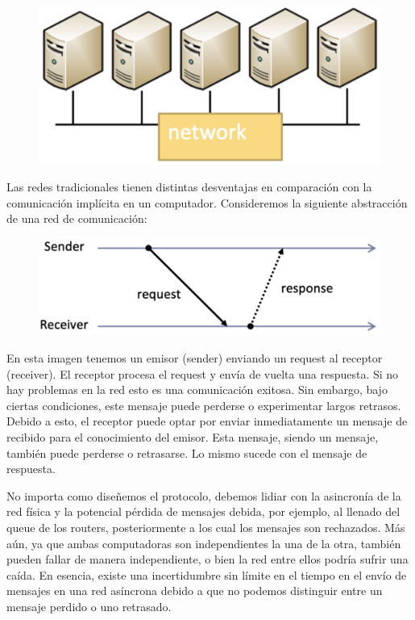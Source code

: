 \documentclass[12pt]{article}
\begin{document}
\begin{figure}[h]
   \centering
   \includegraphics[scale=0.5]{red_computadoras.png}
\end{figure}


Las redes tradicionales tienen distintas desventajas en comparación con la comunicación implícita en un computador. 
Consideremos la siguiente abstracción de una red de comunicación:

\begin{figure}[h]
   \centering
   \includegraphics[scale=0.5]{red_comunicacion.png}
\end{figure}

En esta imagen tenemos un emisor (sender) enviando un request al receptor (receiver).
El receptor procesa el request y envía de vuelta una respuesta. 
Si no hay problemas en la red esto es una comunicación exitosa.
Sin embargo, bajo ciertas condiciones, 
este mensaje puede perderse o experimentar largos retrasos.
Debido a esto,
el receptor puede optar por enviar inmediatamente un mensaje de recibido para el conocimiento del emisor.
Esta mensaje, siendo un mensaje, también puede perderse o retrasarse.
Lo mismo sucede con el mensaje de respuesta.

No importa como diseñemos el protocolo, debemos lidiar con la asincronía de la red física y la potencial pérdida de mensajes debida,
por ejemplo,
al llenado del queue de los routers,
posteriormente a los cual los mensajes son rechazados.
Más aún, 
ya que ambas computadoras son independientes la una de la otra,
también pueden fallar de manera independiente, 
o bien la red entre ellos podría sufrir una caída.
En esencia, 
existe una incertidumbre sin límite en el tiempo en el envío de mensajes en una red asíncrona debido a que no podemos distinguir entre un mensaje perdido o uno retrasado.
\end{document}
